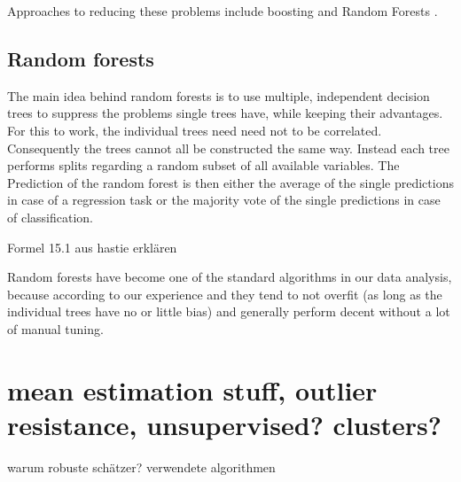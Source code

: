 Approaches to reducing these problems include
boosting \cite{freund1997decision} and Random Forests \cite{Breiman2001}.

\subsection{Random forests}
The main idea behind random forests is to use multiple, independent
decision trees to suppress the problems single trees have, while
keeping their advantages. For this to work, the individual trees need
need not to be correlated. Consequently the trees cannot all
be constructed the same way. Instead each tree performs splits
regarding a random subset of all available variables.
The Prediction of the random forest is then either the average of
the single predictions in case of a regression task or
the majority vote of the single predictions in case of classification.

Formel 15.1 aus hastie erklären

Random forests have become one of the standard algorithms
in our data analysis, because according to our
experience and \cite{hastie2017springer} they tend to
not overfit (as long as the individual trees have no or little bias)
and generally perform decent without a lot of manual tuning.


\section{mean estimation stuff, outlier resistance, unsupervised? clusters?}
warum robuste schätzer?
verwendete algorithmen
